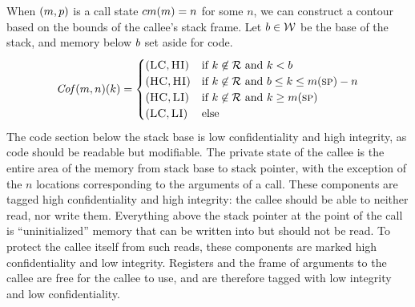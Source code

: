 \documentclass[acmsmall,review,anonymous]{acmart}\settopmatter{printfolios=true,printccs=false,printacmref=false}
\begin{document}
When \((m,p)\) is a call state \(cm(m) = n\)
for some \(n\), we can construct a contour based on the bounds of the
callee's stack frame. Let \(b \in {\mathcal W}\) be the base of the stack,
and memory below \(b\) set aside for code.
\[\mathit{Cof}(m,n)(k) =
\begin{cases}
  (\textsc{LC},\textsc{HI}) & \text{if } k \not \in {\mathcal R}
                       \text{ and } k < b \\
  (\textsc{HC},\textsc{HI}) & \text{if } k \not \in {\mathcal R}
                        \text{ and } b \leq k \leq m(\textsc{sp}) - n \\
  (\textsc{HC},\textsc{LI}) & \text{if } k \not \in {\mathcal R}
                       \text{ and } k \geq m(\textsc{sp}) \\
  (\textsc{LC},\textsc{LI}) & \text{else} \\
\end{cases}\]
The code section below the stack base is low confidentiality and high
integrity, as code should be readable but modifiable.
%
The private state of the callee is the entire area of the memory from stack
base to stack pointer, with the exception of the $n$ locations
corresponding to the arguments of a call. These components are tagged
high confidentiality and high integrity: the callee should be able to
neither read, nor write them.
%
Everything above the stack pointer at the point of the call is
``uninitialized'' memory that can be written into but should not be
read. To protect the callee itself from such reads, these components
are marked high confidentiality and low integrity.
%
Registers and the frame of arguments to the callee are free for the
callee to use, and are therefore tagged with low integrity and low
confidentiality. 


\end{document}
